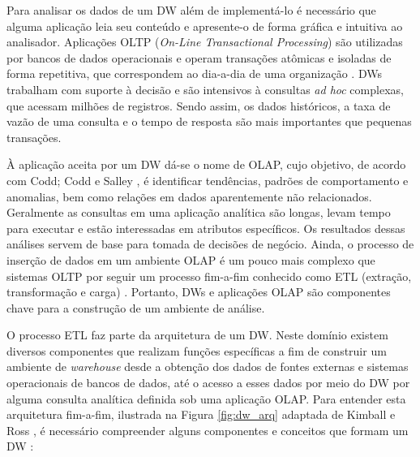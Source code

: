 Para analisar os dados de um DW além de implementá-lo é necessário que alguma aplicação leia seu conteúdo e apresente-o de forma gráfica e intuitiva ao analisador. Aplicações OLTP (\textit{On-Line Transactional Processing}) são utilizadas por bancos de dados operacionais e operam transações atômicas e isoladas de forma repetitiva, que correspondem ao dia-a-dia de uma organização \cite{chaudhuri1997overview}. DWs trabalham com suporte à decisão e são intensivos à consultas \textit{ad hoc} complexas, que acessam milhões de registros. Sendo assim, os dados históricos, a taxa de vazão de uma consulta e o tempo de resposta são mais importantes que pequenas transações.

À aplicação aceita por um DW dá-se o nome de OLAP, cujo objetivo, de acordo com Codd; Codd e Salley \cite{codd1998providing}, é identificar tendências, padrões de comportamento e anomalias, bem como relações em dados aparentemente não relacionados. Geralmente as consultas em uma aplicação analítica são longas, levam tempo para executar e estão interessadas 
em atributos específicos. Os resultados dessas análises servem de base para tomada de decisões de negócio. Ainda, o processo de inserção de dados em um ambiente OLAP é um pouco mais complexo que sistemas OLTP por seguir um processo fim-a-fim conhecido 
como ETL (extração, transformação e carga) \cite{vertabelo2017olap}. Portanto, DWs e aplicações OLAP são componentes chave para a construção de um ambiente de análise.

O processo ETL faz parte da arquitetura de um DW. Neste domínio existem diversos componentes que realizam funções específicas a fim de construir um ambiente de \textit{warehouse} desde a obtenção dos dados de fontes externas e sistemas operacionais de bancos de dados, até o acesso a esses dados por meio do DW por alguma consulta analítica definida sob uma aplicação OLAP. Para entender esta arquitetura fim-a-fim, ilustrada na Figura \ref{fig:dw_arq} adaptada de Kimball e Ross \cite{kimball2002dw}, é necessário compreender alguns componentes e conceitos que formam um DW \cite{kimball2002dw}:

